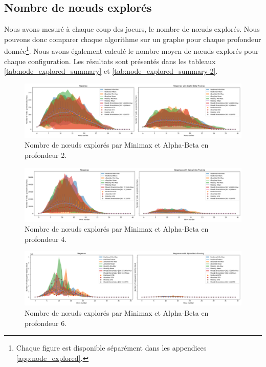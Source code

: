 \subsection{Nombre de nœuds explorés}
\label{subsec:node_explored}
Nous avons mesuré à chaque coup des joeurs, le nombre de nœuds explorés. Nous pouvons donc comparer chaque algorithme sur un graphe pour chaque profondeur donnée\footnote{Chaque figure est disponible séparément dans les appendices \ref{app:node_explored}.}. Nous avons également calculé le nombre moyen de nœuds explorés pour chaque configuration. Les résultats sont présentés dans les tableaux \ref{tab:node_explored_summary} et \ref{tab:node_explored_summary-2}.

\begin{figure}[H]
    \centering
    \includegraphics[width=\textwidth]{ressources/Number of nodes generated by Black_depth_2_combined.png}
    \caption{Nombre de nœuds explorés par Minimax et Alpha-Beta en profondeur 2.}
    \label{fig:complexity_node_explored-2}
\end{figure}

\begin{figure}[H]
    \centering
    \includegraphics[width=\textwidth]{ressources/Number of nodes generated by Black_depth_4_combined.png}
    \caption{Nombre de nœuds explorés par Minimax et Alpha-Beta en profondeur 4.}
    \label{fig:complexity_node_explored-4}
\end{figure}

\begin{figure}[H]
    \centering
    \includegraphics[width=\textwidth]{ressources/Number of nodes generated by Black_depth_6_combined.png}
    \caption{Nombre de nœuds explorés par Minimax et Alpha-Beta en profondeur 6.}
    \label{fig:complexity_node_explored-6}
\end{figure}

